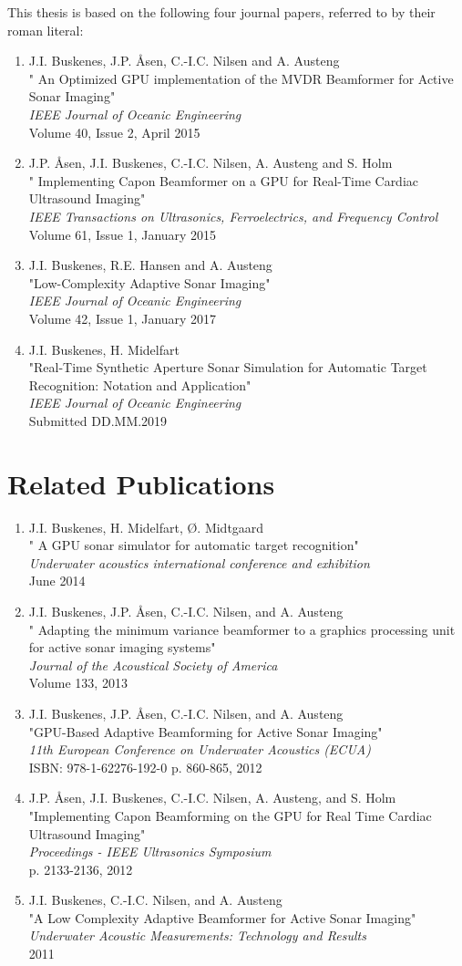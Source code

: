 This thesis is based on the following four journal papers, referred to by their roman literal:

\newcommand\pubEntry[4]{\item #2\\"#1"\\\textit{#3}\\#4}
{\renewcommand{\theenumi}{\textbf{\Roman{enumi}}}
\renewcommand\cleardoublepage{\newpage}
\begin{enumerate}
\pubEntry{%
An Optimized GPU implementation of the MVDR Beamformer for Active Sonar Imaging}%
{J.I. Buskenes, J.P. Åsen, C.-I.C. Nilsen and A. Austeng}%
{IEEE Journal of Oceanic Engineering}%
{Volume 40, Issue 2, April 2015}
%
\pubEntry{%
Implementing Capon Beamformer on a GPU for Real-Time Cardiac Ultrasound Imaging}%
{J.P. Åsen, J.I. Buskenes, C.-I.C. Nilsen, A. Austeng and S. Holm}%
{IEEE Transactions on Ultrasonics, Ferroelectrics, and Frequency Control}%
{Volume 61, Issue 1, January 2015}
%
\pubEntry%
{Low-Complexity Adaptive Sonar Imaging}%
{J.I. Buskenes, R.E. Hansen and A. Austeng}%
{IEEE Journal of Oceanic Engineering}%
{Volume 42, Issue 1, January 2017}
%
\pubEntry%
{Real-Time Synthetic Aperture Sonar Simulation for Automatic Target Recognition: Notation and Application}%
{J.I. Buskenes, H. Midelfart}%
{IEEE Journal of Oceanic Engineering}%
{Submitted DD.MM.2019}
\end{enumerate}


\chapter*{Related Publications}

\begin{enumerate}
\pubEntry{%
A GPU sonar simulator for automatic target recognition}%
{J.I. Buskenes, H. Midelfart, Ø. Midtgaard}%
{Underwater acoustics international conference and exhibition}%
{June 2014}
%
\pubEntry{%
Adapting the minimum variance beamformer to a graphics processing unit for active sonar imaging systems}%
{J.I. Buskenes, J.P. Åsen, C.-I.C. Nilsen, and A. Austeng}%
{Journal of the Acoustical Society of America}%
{Volume 133, 2013}
%
\pubEntry%
{GPU-Based Adaptive Beamforming for Active Sonar Imaging}%
{J.I. Buskenes, J.P. Åsen, C.-I.C. Nilsen, and A. Austeng}%
{11th European Conference on Underwater Acoustics (ECUA)}%
{ISBN: 978-1-62276-192-0 p. 860-865, 2012}
%
\pubEntry%
{Implementing Capon Beamforming on the GPU for Real Time Cardiac Ultrasound Imaging}%
{J.P. Åsen, J.I. Buskenes, C.-I.C. Nilsen, A. Austeng, and S. Holm}%
{Proceedings - IEEE Ultrasonics Symposium}%
{p. 2133-2136, 2012}
%
\pubEntry%
{A Low Complexity Adaptive Beamformer for Active Sonar Imaging}%
{J.I. Buskenes, C.-I.C. Nilsen, and A. Austeng}%
{Underwater Acoustic Measurements: Technology and Results}%
{2011}
\end{enumerate}
}


